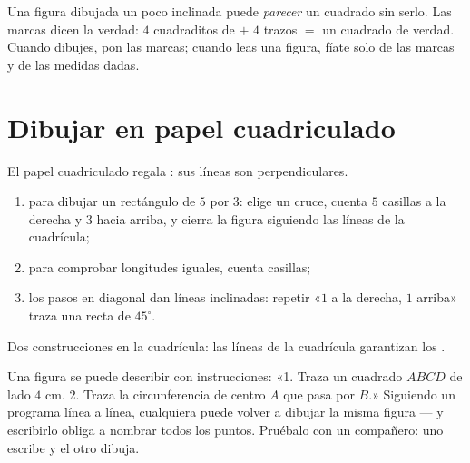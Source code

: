 \begin{example}\label{ex:g3:shapes:marks}
Una figura dibujada un poco inclinada puede \emph{parecer} un cuadrado sin
serlo. Las marcas dicen la verdad: $4$ cuadraditos de  $+$ $4$
trazos $=$ un cuadrado de verdad. Cuando dibujes, pon las marcas; cuando
leas una figura, fíate solo de las marcas y de las medidas dadas.
\end{example}

\section{Dibujar en papel cuadriculado}

\begin{method}\label{met:g3:shapes:grid}
El papel cuadriculado regala : sus líneas son perpendiculares.
\begin{enumerate}
  \item para dibujar un rectángulo de $5$ por $3$: elige un cruce,
        cuenta $5$ casillas a la derecha y $3$ hacia arriba, y cierra la figura
        siguiendo las líneas de la cuadrícula;
  \item para comprobar longitudes iguales, cuenta casillas;
  \item los pasos en diagonal dan líneas inclinadas: repetir «$1$ a la derecha, $1$
        arriba» traza una recta de $45^\circ$.
\end{enumerate}
\end{method}

\begin{omfigure}

{\small Dos construcciones en la cuadrícula: las líneas de la cuadrícula garantizan los
.}
\end{omfigure}

\begin{example}\label{ex:g3:shapes:program}
Una figura se puede describir con instrucciones:
«1. Traza un cuadrado $ABCD$ de lado $4$ cm. 2. Traza la circunferencia de
centro $A$ que pasa por $B$.» Siguiendo un programa línea a línea,
cualquiera puede volver a dibujar la misma figura --- y escribirlo obliga a
nombrar todos los puntos. Pruébalo con un compañero: uno escribe y el otro
dibuja.
\end{example}

